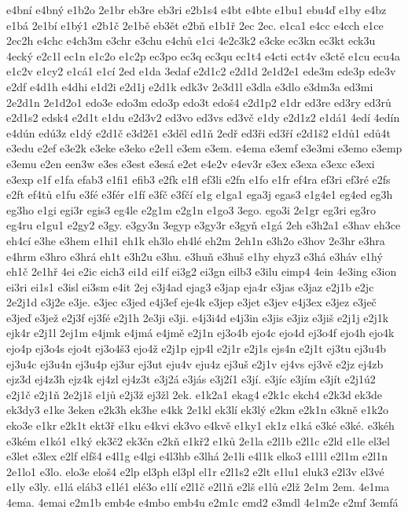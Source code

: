 e4bní
e4bný
e1b2o
2e1br
eb3re
eb3ri
e2b1s4
e4bt
e4bte
e1bu1
ebu4ď
e1by
e4bz
e1bá
2e1bí
e1bý1
e2b1č
2e1bě
eb3ět
e2bň
e1b1ř
2ec
2ec.
e1ca1
e4cc
e4cch
e1ce
2ec2h
e4chc
e4ch3m
e3chr
e3chu
e4chů
e1ci
4e2c3k2
e3cke
ec3kn
ec3kt
eck3u
4ecký
e2c1l
ec1n
e1c2o
e1c2p
ec3po
ec3q
ec3qu
ec1t4
e4cti
ect4v
e3ctě
e1cu
ecu4a
e1c2v
e1cy2
e1cá1
e1cí
2ed
e1da
3edaf
e2d1c2
e2d1d
2e1d2e1
ede3m
ede3p
ede3v
e2df
e4d1h
e4dhi
e1d2i
e2d1j
e2d1k
edk3v
2e3d1l
e3dla
e3dlo
e3dm3a
ed3mi
2e2d1n
2e1d2o1
edo3e
edo3m
edo3p
edo3t
edoš4
e2d1p2
e1dr
ed3re
ed3ry
ed3rů
e2d1s2
edsk4
e2d1t
e1du
e2d3v2
ed3vo
ed3vs
ed3vč
e1dy
e2d1z2
e1dá1
4edí
4edín
e4dún
edú3z
e1dý
e2d1č
e3d2ě1
e3děl
ed1ň
2edř
ed3ři
ed3ří
e2d1š2
e1dů1
edů4t
e3edu
e2ef
e3e2k
e3eke
e3eko
e2e1l
e3em
e3em.
e4ema
e3emf
e3e3mi
e3emo
e3emp
e3emu
e2en
een3w
e3es
e3est
e3esá
e2et
e4e2v
e4ev3r
e3ex
e3exa
e3exc
e3exi
e3exp
e1f
e1fa
efab3
e1fi1
efib3
e2fk
e1fl
ef3li
e2fn
e1fo
e1fr
ef4ra
ef3ri
ef3ré
e2fs
e2ft
ef4tů
e1fu
e3fé
e3fér
e1fí
e3fč
e3fčí
e1g
e1ga1
ega3j
egas3
e1g4e1
eg4ed
eg3h
eg3ho
e1gi
egi3r
egis3
eg4le
e2g1m
e2g1n
e1go3
3ego.
ego3i
2e1gr
eg3ri
eg3ro
eg4ru
e1gu1
e2gy2
e3gy.
e3gy3n
3egyp
e3gy3r
e3gyň
e1gá
2eh
e3h2a1
e3hav
eh3ce
eh4cí
e3he
e3hem
e1hi1
eh1k
eh3lo
eh4lé
eh2m
2eh1n
e3h2o
e3hov
2e3hr
e3hra
e4hrm
e3hro
e3hrá
eh1t
e3h2u
e3hu.
e3huň
e3huš
e1hy
ehyz3
e3há
e3háv
e1hý
eh1č
2e1hř
4ei
e2ic
eich3
ei1d
ei1f
ei3g2
ei3gn
eilb3
e3ilu
eimp4
4ein
4e3ing
e3ion
ei3ri
ei1s1
e3isl
ei3sm
e4it
2ej
e3j4ad
ejag3
e3jap
eja4r
e3jas
e3jaz
e2j1b
e2jc
2e2j1d
e3j2e
e3je.
e3jec
e3jed
e4j3ef
eje4k
e3jep
e3jet
e3jev
e4j3ex
e3jez
e3ječ
e3jeď
e3jež
e2j3f
ej3fé
e2j1h
2e3ji
e3ji.
e4j3i4d
e4j3in
e3jis
e3jiz
e3jiš
e2j1j
e2j1k
ejk4r
e2j1l
2ej1m
e4jmk
e4jmá
e4jmě
e2j1n
ej3o4b
ejo4c
ejo4d
ej3o4f
ejo4h
ejo4k
ejo4p
ej3o4s
ejo4t
ej3o4š3
ejo4ž
e2j1p
ejp4l
e2j1r
e2j1s
ejs4n
e2j1t
ej3tu
ej3u4b
ej3u4c
ej3u4n
ej3u4p
ej3ur
ej3ut
eju4v
eju4z
ej3uš
e2j1v
ej4vs
ej3vě
e2jz
ej4zb
ejz3d
ej4z3h
ejz4k
ej4zl
ej4z3t
e3j2á
e3jás
e3j2í1
e3jí.
e3jíc
e3jím
e3jít
e2j1ú2
e2j1č
e2j1ň
2e2j1š
e1jů
e2j3ž
ej3žl
2ek.
e1k2a1
ekag4
e2k1c
ekch4
e2k3d
ek3de
ek3dy3
e1ke
3eken
e2k3h
ek3he
e4kk
2e1kl
ek3lí
ek3lý
e2km
e2k1n
e3kně
e1k2o
eko3e
e1kr
e2k1t
ekt3ř
e1ku
e4kvi
ek3vo
e4kvě
e1ky1
ek1z
e1ká
e3ké
e3ké.
e3kéh
e3kém
e1kó1
e1ký
ek3č2
ek3čn
e2kň
e1kř2
e1ků
2e1la
e2l1b
e2l1c
e2ld
e1le
el3el
e3let
e3lex
e2lf
elfš4
e4l1g
e4lgi
e4l3hb
e3lhá
2e1li
e4l1k
elko3
e1l1l
e2l1m
e2l1n
2e1lo1
e3lo.
elo3e
eloš4
e2lp
el3ph
el3pl
el1r
e2l1s2
e2lt
e1lu1
eluk3
e2l3v
el3vé
e1ly
e3ly.
e1lá
eláb3
e1lé1
elé3o
e1lí
e2l1č
e2l1ň
e2lš
e1lů
e2lž
2e1m
2em.
4e1ma
4ema.
4emai
e2m1b
emb4e
e4mbo
emb4u
e2m1c
emd2
e3mdl
4e1m2e
e2mf
3emfá
